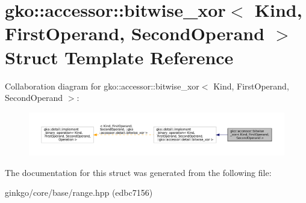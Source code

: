 \hypertarget{structgko_1_1accessor_1_1bitwise__xor}{}\section{gko\+:\+:accessor\+:\+:bitwise\+\_\+xor$<$ Kind, First\+Operand, Second\+Operand $>$ Struct Template Reference}
\label{structgko_1_1accessor_1_1bitwise__xor}


Collaboration diagram for gko\+:\+:accessor\+:\+:bitwise\+\_\+xor$<$ Kind, First\+Operand, Second\+Operand $>$\+:
\nopagebreak
\begin{figure}[H]
\begin{center}
\leavevmode
\includegraphics[width=350pt]{structgko_1_1accessor_1_1bitwise__xor__coll__graph}
\end{center}
\end{figure}


The documentation for this struct was generated from the following file\+:\begin{DoxyCompactItemize}
\item 
ginkgo/core/base/range.\+hpp (edbc7156)\end{DoxyCompactItemize}
